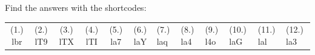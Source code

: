 \begin{enumerate}[noitemsep, label=\textbf{\arabic*}. ]
\begin{figure}[H]
\begin{center}
      \vspace{2pt}
    \vspace{.1in}
    
    \end{center}

 \end{figure}   

    \addtocounter{footnote}{-0}
            \end{enumerate}
        
    

  \label{m39358**end}
          
       
    
  \label{84e7e983e7dc2060d6909eddb5375c22**end}
    
\par {} Find the answers with the shortcodes:
 \par \begin{tabular}[h]{cccccc}
 (1.) lbr  &  (2.) lT9  &  (3.) lTX  &  (4.) lTI  &  (5.) la7  &  (6.) laY  &  (7.) laq  &  (8.) la4  &  (9.) l4o  &  (10.) laG  &  (11.) lal  &  (12.) la3  & \end{tabular}

       
    \label{m39368*eip-514}

